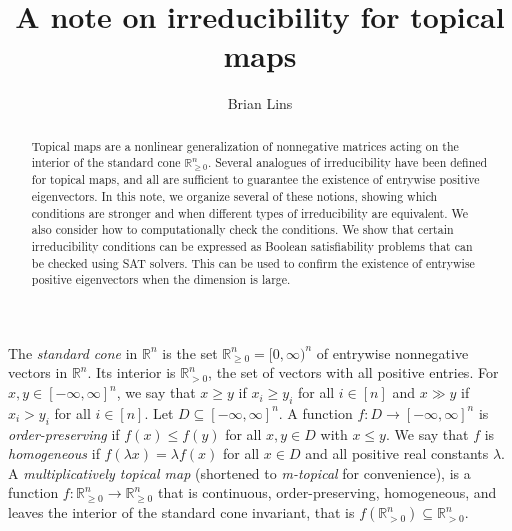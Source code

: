 \documentclass[10pt,reqno]{amsart}
\newcommand{\R}{\mathbb{R}}
\theoremstyle{plain}
\theoremstyle{definition}
\numberwithin{equation}{section}
\begin{document}
\title[A note on irreducibility for topical maps]{A note on irreducibility for topical maps}
\author[B. Lins]{Brian Lins}
\date{}
\address{Brian Lins, Hampden-Sydney College}


\begin{abstract}
Topical maps are a nonlinear generalization of nonnegative matrices acting on the interior of the standard cone $\R^n_{\ge 0}$. Several analogues of irreducibility have been defined for topical maps, and all are sufficient to guarantee the existence of entrywise positive eigenvectors.  In this note, we organize several of these notions, showing which conditions are stronger and when different types of irreducibility are equivalent.  We also consider how to computationally check the conditions. We show that certain irreducibility conditions can be expressed as Boolean satisfiability problems that can be checked using SAT solvers. This can be used to confirm the existence of entrywise positive eigenvectors when the dimension is large. 
\end{abstract}

\maketitle


The \emph{standard cone} in $\R^n$ is the set $\R^n_{\ge 0} = [0,\infty)^n$ of entrywise nonnegative vectors in $\R^n$. Its interior is $\R^n_{>0}$, the set of vectors with all positive entries. For $x, y \in [-\infty, \infty]^n$, we say that $x \ge y$ if $x_i \ge y_i$ for all $i \in [n]$ and $x \gg y$ if $x_i > y_i$ for all $i \in [n]$.  Let $D \subseteq [-\infty, \infty]^n$.  A function $f: D \rightarrow [-\infty, \infty]^n$ is \emph{order-preserving} if $f(x) \le f(y)$ for all $x, y \in D$ with $x \le y$.  We say that $f$ is \emph{homogeneous} if $f(\lambda x) = \lambda f(x)$ for all $x \in D$ and all positive real constants $\lambda$. A \emph{multiplicatively topical map} (shortened to \emph{m-topical} for convenience), is a function $f:\R^n_{\ge 0} \rightarrow \R^n_{\ge 0}$ that is continuous, order-preserving, homogeneous, and leaves the interior of the standard cone invariant, that is $f(\R^n_{>0}) \subseteq \R^n_{>0}$. 
\end{document}
